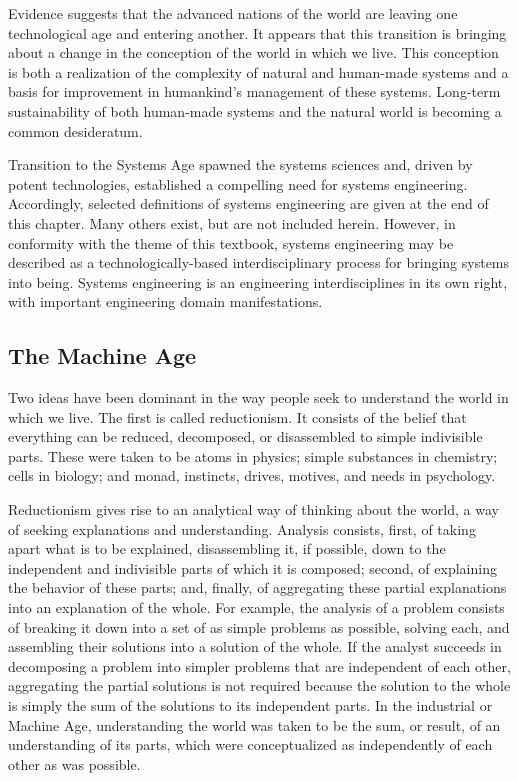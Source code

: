 Evidence suggests that the advanced nations of the world are leaving one technological age and entering another. It appears that this transition is bringing about a change in the conception of the world in which we live. This conception is both a realization of the complexity of natural and human-made systems and a basis for improvement in humankind’s management of these systems. Long-term sustainability of both human-made systems and the natural world is becoming a common desideratum.

Transition to the Systems Age spawned the systems sciences and, driven by potent technologies, established a compelling need for systems engineering. Accordingly, selected definitions of systems engineering are given at the end of this chapter. Many others exist, but are not included herein. However, in conformity with the theme of this textbook, systems engineering may be described as a technologically-based interdisciplinary process for bringing systems into being. Systems engineering is an engineering interdisciplines in its own right, with important engineering domain manifestations.

\subsection{The Machine Age}

Two ideas have been dominant in the way people seek to understand the world in which we live. The first is called reductionism. It consists of the belief that everything can be reduced, decomposed, or disassembled to simple indivisible parts. These were taken to be atoms in physics; simple substances in chemistry; cells in biology; and monad, instincts, drives, motives, and needs in psychology.

Reductionism gives rise to an analytical way of thinking about the world, a way of seeking explanations and understanding. Analysis consists, first, of taking apart what is to be explained, disassembling it, if possible, down to the independent and indivisible parts of which it is composed; second, of explaining the behavior of these parts; and, finally, of aggregating these partial explanations into an explanation of the whole. For example, the analysis of a problem consists of breaking it down into a set of as simple problems as possible, solving each, and assembling their solutions into a solution of the whole. If the analyst succeeds in decomposing a problem into simpler problems that are independent of each other, aggregating the partial solutions is not required because the solution to the whole is simply the sum of the solutions to its independent parts. In the industrial or Machine Age, understanding the world was taken to be the sum, or result, of an understanding of its parts, which were conceptualized as independently of each other as was possible.

